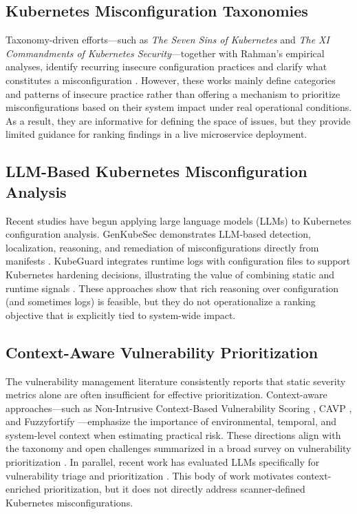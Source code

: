 \documentclass[12pt]{article}
\begin{document}
\subsection{Kubernetes Misconfiguration Taxonomies}
Taxonomy-driven efforts—such as \emph{The Seven Sins of Kubernetes} and \emph{The XI Commandments of Kubernetes Security}—together with Rahman’s empirical analyses, identify recurring insecure configuration practices and clarify what constitutes a misconfiguration \cite{rahman2019seven,shamim2020xi,rahman2018characteristics}. However, these works mainly define categories and patterns of insecure practice rather than offering a mechanism to prioritize misconfigurations based on their system impact under real operational conditions. As a result, they are informative for defining the space of issues, but they provide limited guidance for ranking findings in a live microservice deployment.

\subsection{LLM-Based Kubernetes Misconfiguration Analysis}
Recent studies have begun applying large language models (LLMs) to Kubernetes configuration analysis. GenKubeSec demonstrates LLM-based detection, localization, reasoning, and remediation of misconfigurations directly from manifests \cite{malul2024genkubesec}. KubeGuard integrates runtime logs with configuration files to support Kubernetes hardening decisions, illustrating the value of combining static and runtime signals \cite{cohen2025kubeguard}. These approaches show that rich reasoning over configuration (and sometimes logs) is feasible, but they do not operationalize a ranking objective that is explicitly tied to system-wide impact.

\subsection{Context-Aware Vulnerability Prioritization}
The vulnerability management literature consistently reports that static severity metrics alone are often insufficient for effective prioritization. Context-aware approaches—such as Non-Intrusive Context-Based Vulnerability Scoring \cite{zhuang2016non}, CAVP \cite{jung2022cavp}, and Fuzzyfortify \cite{hafiz2025fuzzyfortify}—emphasize the importance of environmental, temporal, and system-level context when estimating practical risk. These directions align with the taxonomy and open challenges summarized in a broad survey on vulnerability prioritization \cite{jiang2025survey}. In parallel, recent work has evaluated LLMs specifically for vulnerability triage and prioritization \cite{haddad2025prompting}. This body of work motivates context-enriched prioritization, but it does not directly address scanner-defined Kubernetes misconfigurations.
\end{document}
